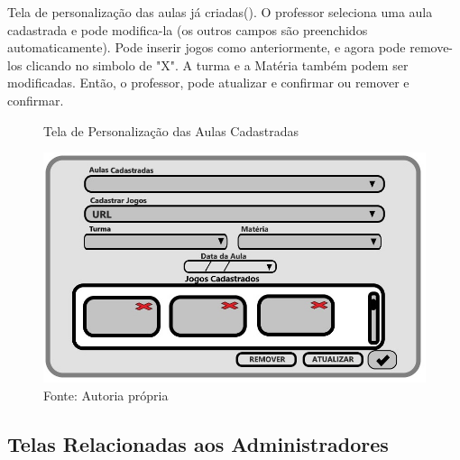 \documentclass{utfpr-pg}
\begin{document}
    Tela de personalização das aulas já criadas(). O professor seleciona uma aula cadastrada  e pode modifica-la (os outros campos são preenchidos automaticamente). Pode inserir jogos como anteriormente, e agora pode remove-los clicando no simbolo de "X". A turma e a Matéria também podem ser modificadas. Então, o professor, pode atualizar e confirmar ou remover e confirmar.
        \begin{figure}[H]
            \centering
            \captionsetup{width=0.9\textwidth}
            \caption{Tela de Personalização das Aulas Cadastradas}
            \includegraphics[width=\linewidth]{fotos/9.jpg}
            \caption*{Fonte: Autoria própria}
            \label{fig:9}
        \end{figure}
    
    \subsection{Telas Relacionadas aos Administradores}
    
\end{document}
